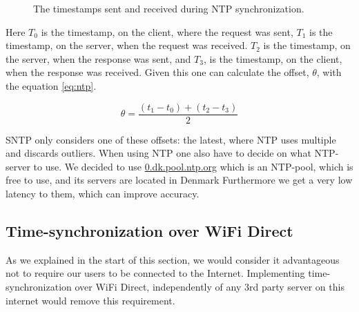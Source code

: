 \begin{figure}[htb]
    \centering
    \caption{The timestamps sent and received during \ac{NTP} synchronization.}
    \label{fig:ntp_packets}
\end{figure}

Here $T_0$ is the timestamp, on the client, where the request was sent, $T_1$ is the timestamp, on the server, when the request was received.
$T_2$ is the timestamp, on the server, when the response was sent, and $T_3$, is the timestamp, on the client, when the response was received.
Given this one can calculate the offset, $\theta$, with the equation \ref{eq:ntp}.

\begin{equation}\label{eq:ntp}
    \theta = \frac{(t_1 - t_0)+(t_2 - t_3)}{2}
\end{equation}

\ac{SNTP} only considers one of these offsets: the latest, where \ac{NTP} uses multiple and discards outliers.
When using \ac{NTP} one also have to decide on what \ac{NTP}-server to use.
We decided to use \url{0.dk.pool.ntp.org} which is an \ac{NTP}-pool, which is free to use, and its servers are located in Denmark
Furthermore we get a very low latency to them, which can improve accuracy.

\subsection{Time-synchronization over WiFi Direct}
As we explained in the start of this section, we would consider it advantageous not to require our users to be connected to the Internet.
Implementing time-synchronization over WiFi Direct, independently of any 3rd party server on this internet would remove this requirement.

